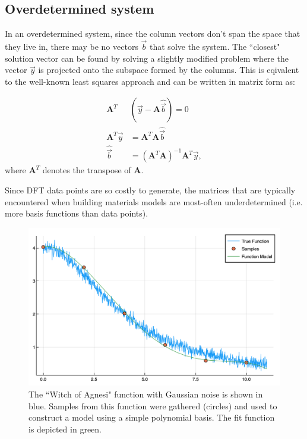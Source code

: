 \subsection{Overdetermined system}
In an overdetermined system, since the column vectors don't span the space that they live in, there may be no vectors $\vec{b}$ that solve the system.  The ``closest" solution vector can be found by solving a slightly modified problem where the vector $\vec{y}$ is projected onto the subspace formed by the columns.  This is eqivalent to the well-known least squares approach and can be written in matrix form as:

\begin{align}
\mathbf{A}^T&(\vec{y} - \mathbf{A} \hat{\vec{b}}) = 0 \\
\mathbf{A}^T\vec{y} &= \mathbf{A}^T\mathbf{A}\hat{\vec{b}} \\
\hat{\vec{b}} &= (\mathbf{A}^T\mathbf{A})^{-1}\mathbf{A}^T\vec{y}, \label{eq:bSolve}
\end{align}
where $\mathbf{A}^T$ denotes the transpose of $\mathbf{A}$.

\par Since DFT data points are so costly to generate, the matrices that are typically encountered when building materials models are most-often underdetermined (i.e. more basis functions than data points).


\begin{figure}%
\centering
\includegraphics[scale = 0.5]{Figures/func1True}
\caption{The ``Witch of Agnesi" function with Gaussian noise is shown in blue.  Samples from this function were gathered (circles) and used to construct a model using a simple polynomial basis.  The fit function is depicted in green.
\label{fig:func1True}} 
\end{figure}



